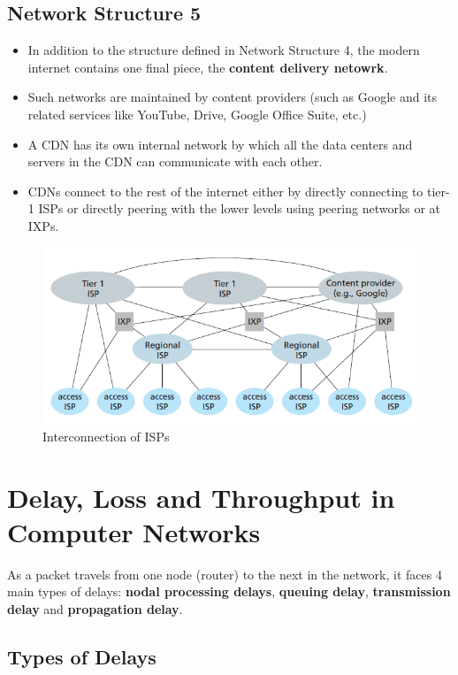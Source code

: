 \documentclass{article}
\theoremstyle{plain}
\theoremstyle{definition}
\begin{document}
\subsection{Network Structure 5}
\begin{itemize}
    \item In addition to the structure defined in Network Structure 4, the modern internet contains one final piece, the \textbf{content delivery netowrk}.
    
    \item Such networks are maintained by content providers (such as Google and its related services like YouTube, Drive, Google Office Suite, etc.)
    
    \item A CDN has its own internal network by which all the data centers and servers in the CDN can communicate with each other. 
    
    \item CDNs connect to the rest of the internet either by directly connecting to tier-1 ISPs or directly peering with the lower levels using peering networks or at IXPs.
\end{itemize}
\begin{figure}
    \centering
    \includegraphics{cn9.png}
    \caption{Interconnection of ISPs}
    \label{fig:my_label_9}
\end{figure}

\section{Delay, Loss and Throughput in Computer Networks}
As a packet travels from one node (router) to the next in the network, it faces 4 main types of delays: \textbf{nodal processing delays}, \textbf{queuing delay}, \textbf{transmission delay} and \textbf{propagation delay}.

\subsection{Types of Delays}
\end{document}
